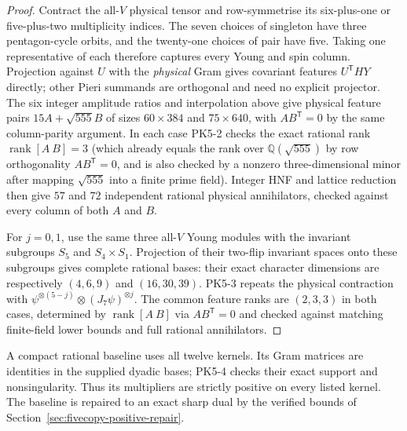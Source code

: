 \begin{proof}
Contract the all-$V$ physical tensor and row-symmetrise its six-plus-one
or five-plus-two multiplicity indices. The seven choices of singleton
have three pentagon-cycle orbits, and the twenty-one choices of pair
have five. Taking one representative of each therefore captures every
Young and spin column. Projection against $U$ with the \emph{physical}
Gram gives covariant features $U^{\mathsf T}H Y$ directly; other Pieri
summands are orthogonal and need no explicit projector. The six integer
amplitude ratios and interpolation above give physical feature pairs
$15A+\sqrt{555}B$ of sizes $60\times384$ and $75\times640$, with $A B^{\mathsf T}=0$
by the same column-parity argument.
In each case PK5-2 checks the exact rational rank
$\operatorname{rank}[A\ B]=3$ (which already equals the rank over $\mathbb Q(\sqrt{555})$
by row orthogonality $A B^{\mathsf T}=0$, and is also checked by a nonzero
three-dimensional minor after mapping $\sqrt{555}$ into a finite prime field).
Integer HNF and
lattice reduction then give $57$ and $72$ independent rational physical
annihilators, checked against every column of both $A$ and $B$.

For $j=0,1$, use the same three all-$V$ Young modules with the invariant
subgroups $S_5$ and $S_4\times S_1$. Projection of their two-flip invariant
spaces onto these subgroups gives complete rational bases: their exact
character dimensions are respectively $(4,6,9)$ and $(16,30,39)$.
PK5-3 repeats the physical contraction with
$\psi^{\otimes(5-j)}\otimes(J_7\psi)^{\otimes j}$.
The common feature ranks are $(2,3,3)$ in both cases, determined by
$\operatorname{rank}[A\ B]$ via $A B^{\mathsf T}=0$ and checked against
matching finite-field lower bounds and full rational annihilators.

\end{proof}

A compact rational baseline uses all twelve kernels. Its Gram matrices are
identities in the supplied dyadic bases; PK5-4 checks their exact support
and nonsingularity. Thus its multipliers are strictly positive on every
listed kernel. The baseline is repaired to an exact sharp dual by the verified
bounds of Section~\ref{sec:fivecopy-positive-repair}.

